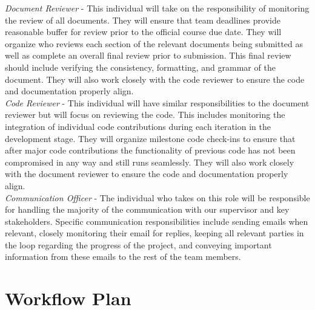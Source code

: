 \documentclass{article}
\begin{document}
\textit{Document Reviewer} - This individual will take on the responsibility of monitoring the review of all
documents. They will ensure that team deadlines provide reasonable buffer for review prior to the official course
due date. They will organize who reviews each section of the relevant documents being submitted as well as complete
an overall final review prior to submission. This final review should include verifying the consistency,
formatting, and grammar of the document. They will also work closely with the code reviewer to ensure the code and
documentation properly align.\\

\textit{Code Reviewer} - This individual will have similar responsibilities to the document reviewer but will focus
on reviewing the code. This includes monitoring the integration of individual code contributions during each
iteration in the development stage. They will organize milestone code check-ins to ensure that after major code
contributions the functionality of previous code has not been compromised in any way and still runs seamlessly. They
will also work closely with the document reviewer to ensure the code and documentation properly align.\\

\textit{Communication Officer} - The individual who takes on this role will be responsible for handling the majority
of the communication with our supervisor and key stakeholders. Specific communication responsibilities include
sending emails when relevant, closely monitoring their email for replies, keeping all relevant parties in the loop
regarding the progress of the project, and conveying important information from these emails to the rest of the team
members.

\section{Workflow Plan}

\iffalse
\begin{itemize}
	\item How will you be using git, including branches, pull request, etc.?
	\item How will you be managing issues, including template issues, issue
	classification, etc.?
  \item Use of CI/CD
\end{itemize}
\fi
\end{document}
